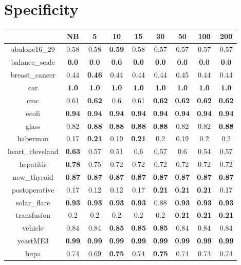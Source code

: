 \documentclass{article}%
\begin{document}
%
\section*{Specificity}%
\begin{tabular}{c|cccccccc}%
\hline%
&NB&5&10&15&30&50&100&200\\%
\hline%
abalone16\_29&0.58&0.58&\textbf{0.59}&0.58&0.57&0.57&0.57&0.57\\%
\hline%
balance\_scale&\textbf{0.0}&\textbf{0.0}&\textbf{0.0}&\textbf{0.0}&\textbf{0.0}&\textbf{0.0}&\textbf{0.0}&\textbf{0.0}\\%
\hline%
breast\_cancer&0.44&\textbf{0.46}&0.44&0.44&0.44&0.45&0.44&0.44\\%
\hline%
car&\textbf{1.0}&\textbf{1.0}&\textbf{1.0}&\textbf{1.0}&\textbf{1.0}&\textbf{1.0}&\textbf{1.0}&\textbf{1.0}\\%
\hline%
cmc&0.61&\textbf{0.62}&0.6&0.61&\textbf{0.62}&\textbf{0.62}&\textbf{0.62}&\textbf{0.62}\\%
\hline%
ecoli&\textbf{0.94}&\textbf{0.94}&\textbf{0.94}&\textbf{0.94}&\textbf{0.94}&\textbf{0.94}&\textbf{0.94}&\textbf{0.94}\\%
\hline%
glass&0.82&\textbf{0.88}&\textbf{0.88}&\textbf{0.88}&\textbf{0.88}&0.82&0.82&\textbf{0.88}\\%
\hline%
haberman&0.17&\textbf{0.21}&0.19&\textbf{0.21}&0.2&0.19&0.2&0.2\\%
\hline%
heart\_cleveland&\textbf{0.63}&0.57&0.51&0.6&0.57&0.6&0.54&0.57\\%
\hline%
hepatitis&\textbf{0.78}&0.75&0.72&0.72&0.72&0.72&0.72&0.72\\%
\hline%
new\_thyroid&\textbf{0.87}&\textbf{0.87}&\textbf{0.87}&\textbf{0.87}&\textbf{0.87}&\textbf{0.87}&\textbf{0.87}&\textbf{0.87}\\%
\hline%
postoperative&0.17&0.12&0.12&0.17&\textbf{0.21}&\textbf{0.21}&\textbf{0.21}&0.17\\%
\hline%
solar\_flare&\textbf{0.93}&\textbf{0.93}&\textbf{0.93}&\textbf{0.93}&0.88&\textbf{0.93}&\textbf{0.93}&\textbf{0.93}\\%
\hline%
transfusion&0.2&0.2&0.2&0.2&0.2&\textbf{0.21}&\textbf{0.21}&\textbf{0.21}\\%
\hline%
vehicle&0.84&0.84&\textbf{0.85}&\textbf{0.85}&\textbf{0.85}&0.84&0.84&0.84\\%
\hline%
yeastME3&\textbf{0.99}&\textbf{0.99}&\textbf{0.99}&\textbf{0.99}&\textbf{0.99}&\textbf{0.99}&\textbf{0.99}&\textbf{0.99}\\%
\hline%
bupa&0.74&0.69&\textbf{0.75}&0.74&\textbf{0.75}&0.74&0.73&0.74\\%

\end{tabular}
\end{document}
